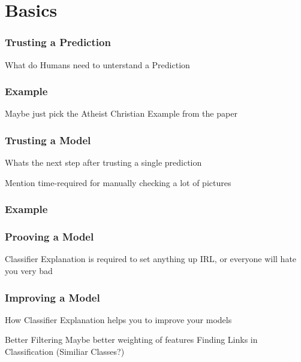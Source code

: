 \section{Basics}
\begin{frame}
	\frametitle{Trusting a Prediction}
	What do Humans need to unterstand a Prediction
\end{frame}
\begin{frame}
	\frametitle{Example}
	Maybe just pick the Atheist Christian Example from the paper
\end{frame}
\begin{frame}
	\frametitle{Trusting a Model}
	Whats the next step after trusting a single prediction
	
	Mention time-required for manually checking a lot of pictures
\end{frame}
\begin{frame}
	\frametitle{Example}
	
\end{frame}
\begin{frame}
	\frametitle{Prooving a Model}
	Classifier Explanation is required to set anything up IRL, or everyone will hate you very bad
\end{frame}
\begin{frame}
	\frametitle{Improving a Model}
	How Classifier Explanation helps you to improve your models
	
	Better Filtering
	Maybe better weighting of features
	Finding Links in Classification (Similiar Classes?)
\end{frame}
